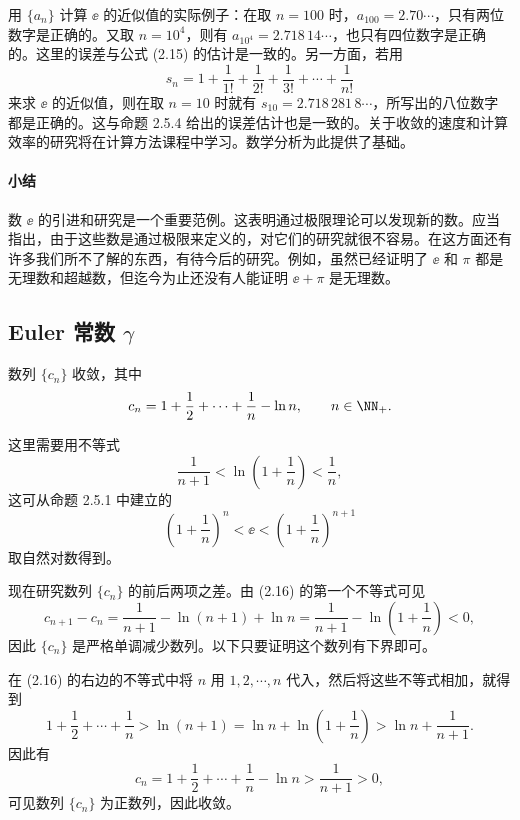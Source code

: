用 $\{a_n\}$ 计算 $\ee$ 的近似值的实际例子：在取 $n=100$ 时，$a_{100}=2.70\cdots$，只有两位数字是正确的。又取 $n=10^4$，则有 $a_{10^4}=2.718\,14\cdots$，也只有四位数字是正确的。这里的误差与公式 (2.15) 的估计是一致的。另一方面，若用
\[
  s_n=1+\frac1{1!}+\frac1{2!}+\frac1{3!}+\cdots+\frac1{n!}
\]
来求 $\ee$ 的近似值，则在取 $n=10$ 时就有 $s_{10}=2.718\,281\,8\cdots$，所写出的八位数字都是正确的。这与命题 2.5.4 给出的误差估计也是一致的。关于收敛的速度和计算效率的研究将在计算方法课程中学习。数学分析为此提供了基础。

\paragraph{小结}
数 $\ee$ 的引进和研究是一个重要范例。这表明通过极限理论可以发现新的数。应当指出，由于这些数是通过极限来定义的，对它们的研究就很不容易。在这方面还有许多我们所不了解的东西，有待今后的研究。例如，虽然已经证明了 $\ee$ 和 $\pi$ 都是无理数和超越数，但迄今为止还没有人能证明 $\ee+\pi$ 是无理数。

\subsection{\texorpdfstring{Euler 常数 $\gamma$}{Euler 常数 gamma}}

\begin{xproposition}[2.5.6]
数列 $\{c_n\}$ 收敛，其中
\[
  c_n=1+\frac12+\cdots+\frac1n-\ln n,\qquad n\in\NN_+.
\]
\end{xproposition}
\begin{xproof}
这里需要用不等式
\begin{equation}
  \frac1{n+1}<\ln\left(1+\frac1n\right)<\frac1n,
  \tag{2.16}
  \label{eq:2.16}
\end{equation}
这可从命题 2.5.1 中建立的
\[
  \left(1+\frac1n\right)^n<\ee<\left(1+\frac1n\right)^{n+1}
\]
取自然对数得到。

现在研究数列 $\{c_n\}$ 的前后两项之差。由 (2.16) 的第一个不等式可见
\[
  c_{n+1}-c_n=\frac1{n+1}-\ln(n+1)+\ln n
  =\frac1{n+1}-\ln\left(1+\frac1n\right)<0,
\]
因此 $\{c_n\}$ 是严格单调减少数列。以下只要证明这个数列有下界即可。

在 (2.16) 的右边的不等式中将 $n$ 用 $1,2,\cdots,n$ 代入，然后将这些不等式相加，就得到
\[
  1+\frac12+\cdots+\frac1n>\ln(n+1)
  =\ln n+\ln\left(1+\frac1n\right)>\ln n+\frac1{n+1}.
\]
因此有
\[
  c_n=1+\frac12+\cdots+\frac1n-\ln n>\frac1{n+1}>0,
\]
可见数列 $\{c_n\}$ 为正数列，因此收敛。
\end{xproof}

